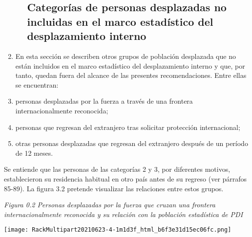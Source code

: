 \documentclass[
]{book}
\begin{document}
\begin{enumerate}
\begin{enumerate}
{    \subsection{Categorías de personas desplazadas no incluidas en el marco estadístico del desplazamiento interno}\label{categoruxedas-de-personas-desplazadas-no-incluidas-en-el-marco-estaduxedstico-del-desplazamiento-interno}}
  \end{enumerate}
\item
  En esta sección se describen otros grupos de población desplazada que no están incluidos en el marco estadístico del desplazamiento interno y que, por tanto, quedan fuera del alcance de las presentes recomendaciones. Entre ellas se encuentran:
\item
  personas desplazadas por la fuerza a través de una frontera internacionalmente reconocida;
\item
  personas que regresan del extranjero tras solicitar protección internacional;
\item
  otras personas desplazadas que regresan del extranjero después de un período de 12 meses.
\end{enumerate}

Se entiende que las personas de las categorías 2 y 3, por diferentes motivos, establecieron su residencia habitual en otro país antes de su regreso (ver párrafos 85-89). La figura 3.2 pretende visualizar las relaciones entre estos grupos.

\emph{Figura 0.2 Personas desplazadas por la fuerza que cruzan una frontera internacionalmente reconocida y su relación con la población estadística de PDI}

\texttt{[image: RackMultipart20210623-4-1m1d3f\_html\_b6f3e31d15ec06fc.png]}
\end{document}
